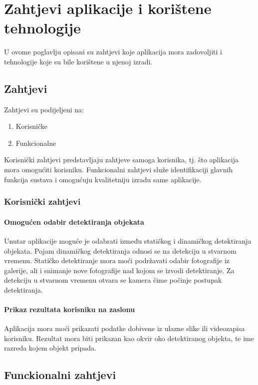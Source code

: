 \chapter{Zahtjevi aplikacije i korištene tehnologije}
U ovome poglavlju opisani su zahtjevi koje aplikacija mora zadovoljiti i tehnologije koje su bile korištene u njenoj izradi. 

\section{Zahtjevi}

Zahtjevi su 
podijeljeni na:
\begin{enumerate}
    \item Korisničke
    \item Funkcionalne
\end{enumerate}

Korisnički zahtjevi predstavljaju zahtjeve samoga korisnika, tj. što aplikacija mora omogućiti korisniku.
Funkcionalni zahtjevi služe identifikaciji glavnih funkcija sustava i omogućuju kvalitetniju izradu same
aplikacije.

\subsection{Korisnički zahtjevi}
\subsubsection{Omogućen odabir detektiranja objekata} 
Unutar aplikacije moguće je odabrati između statičkog i dinamičkog detektiranja
objekata. Pojam dinamičkog detektiranja odnosi se na detekciju u stvarnom vremenu. Statičko detektiranje mora moći podržavati odabir fotografije iz galerije, ali i snimanje nove fotografije nad kojom se 
izvodi detektiranje. Za detekciju u stvarnom vremenu otvara se kamera čime počinje postupak detektiranja. 

\subsubsection{Prikaz rezultata korisniku na zaslonu}
Aplikacija mora moći prikazati podatke dobivene iz ulazne slike ili videozapisa korisniku. Rezultat mora biti prikazan 
kao okvir oko detektiranog objekta, te ime razreda kojem objekt pripada.

\section{Funckionalni zahtjevi}
